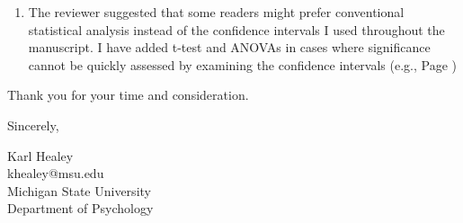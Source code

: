 \documentclass[12pt]{article}
\begin{document}
\begin{enumerate}
	\item
	The reviewer suggested that some readers might prefer conventional statistical analysis instead of the confidence intervals I used throughout the manuscript. I have added t-test and ANOVAs in cases where significance cannot be quickly assessed by examining the confidence intervals (e.g., Page \pageref{t1})





	

\end{enumerate}





\vspace{20pt}

Thank you for your time and consideration.

\vspace{10pt}

Sincerely,

\vspace{10pt}

Karl Healey\\
khealey@msu.edu\\
Michigan State University\\
Department of Psychology


\end{document}
